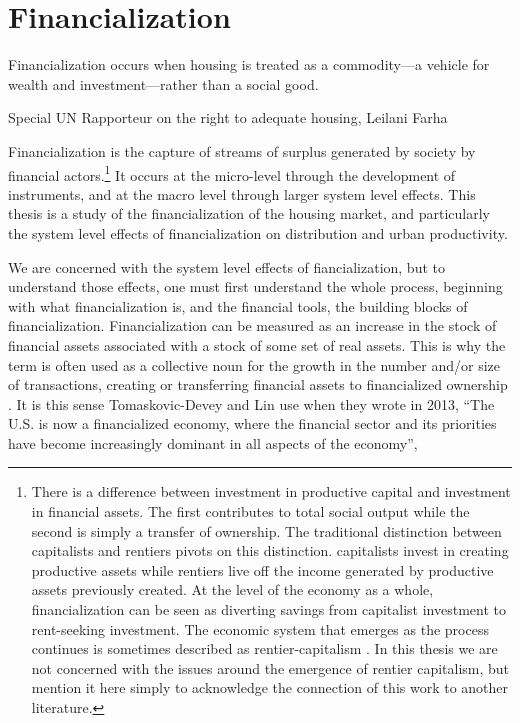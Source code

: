 \chapter{Financialization} \label{chapter-financialization}
\epigraph{Financialization occurs when housing is treated as a commodity---a vehicle for wealth and investment---rather than a social good.}{Special UN Rapporteur on the right to adequate housing, Leilani Farha \cite{farhaReportFinancializationHousing2017}}

Financialization is the capture of streams of surplus generated by society by financial actors.\footnote{There is a difference between investment in productive capital and investment in financial assets. The first contributes to total social output while the second is simply a transfer of ownership. The traditional distinction between capitalists and \glspl{rentier} pivots on this distinction. capitalists invest in creating productive assets while  rentiers live off the income generated by productive assets previously created. At the level of the economy as a whole, financialization can be seen as diverting savings from capitalist investment to rent-seeking investment. The economic system  that emerges as the process continues is sometimes described as rentier-capitalism \cite{christophersClassAssetsWork2021,  standingCorruptionCapitalismWhy2017}. In this thesis we are not concerned with the issues around the emergence of rentier capitalism, but mention it here simply to  acknowledge the connection of this work to another literature.} It occurs at the micro-level through the development of instruments, and at the macro level through larger system level effects. This thesis is a study of the financialization of the housing market, and particularly the system level effects of financialization on distribution and urban productivity. 

We are concerned with the system level effects of fiancialization, but to understand those effects, one must first understand the whole process, beginning with what financialization is, and the financial tools, the building blocks of financialization. 
Financialization can be measured as an increase in the stock of financial assets associated with a stock of some set of real assets. This is why the term is often used as a collective noun for the growth in the number and/or size of  transactions, creating or transferring financial assets to financialized ownership \cite{GET_financialization-numberOfTransactions}. %
It is this sense  Tomaskovic-Devey and Lin use when they wrote in 2013, ``The U.S. is now a financialized economy, where the financial sector and its priorities have become increasingly dominant in all aspects of the economy''\cite{tomaskovic-deveyFinancializationCausesInequality2013}, 

